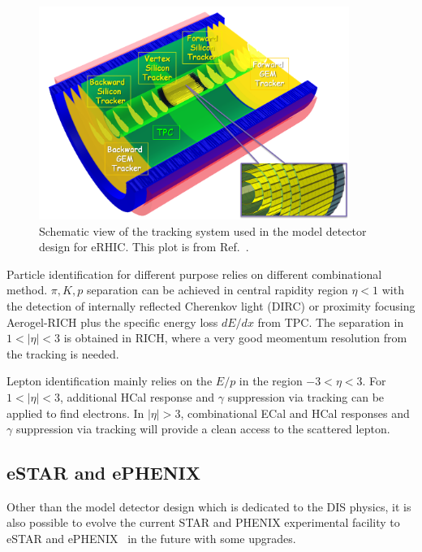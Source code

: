 \begin{figure}
\centering
\includegraphics[width=0.9\textwidth]{plots/chpt4/eRHIC_model_tracking.png}
\caption[A schematic view of the tracking system in the eRHIC model detector design]{
Schematic view of the tracking system used in the model detector design for eRHIC. This plot is from Ref.~\cite{Aschenauer:2014a}.}
\label{fig:tracking_eRHIC}
\end{figure}


Particle identification for different purpose relies on different combinational
method. $\pi, K, p$ separation can be achieved in central rapidity region
$\eta<1$ with the detection of internally reflected Cherenkov light (DIRC) or proximity
focusing Aerogel-RICH plus the specific energy loss $dE/dx$ from TPC. The separation in
$1<|\eta|<3$ is obtained in RICH, where a very good meomentum resolution from
the tracking is needed.

Lepton identification mainly relies on the $E/p$ in the region $-3<\eta<3$. For
$1<|\eta|<3$, additional HCal response and $\gamma$ suppression via tracking can
be applied to find electrons. In $|\eta|>3$, combinational ECal and HCal
responses and $\gamma$ suppression via tracking will provide a clean access to
the scattered lepton.


\subsection{eSTAR and ePHENIX}
Other than the model detector design which is dedicated to the DIS physics, it
is also possible to evolve the current STAR and PHENIX experimental facility to
eSTAR and ePHENIX~\cite{Adare:2014aaa} in the future with some upgrades. 


